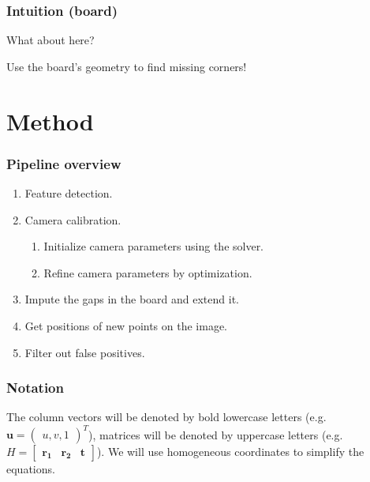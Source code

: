 \documentclass{beamer}
\begin{document}
\begin{frame}
	\frametitle{Intuition (board)}
	What about here?

	\begin{figure}
	\end{figure}
\end{frame}

\begin{frame}[standout]
	Use the board's geometry to find missing corners!
\end{frame}

\section*{Method}\label{sec:method}

\begin{frame}
	\frametitle{Pipeline overview}

	\begin{enumerate}
		\item Feature detection.
		\item Camera calibration.
		      \begin{enumerate}
			      \item Initialize camera parameters using the solver.
			      \item Refine camera parameters by optimization.
		      \end{enumerate}
		\item Impute the gaps in the board and extend it.
		\item Get positions of new points on the image.
		\item Filter out false positives.
	\end{enumerate}
\end{frame}

\begin{frame}
	\frametitle{Notation}
	The column vectors will be denoted by bold lowercase letters (e.g.
	\(\mathbf{u} = \begin{pmatrix}
		u, v, 1
	\end{pmatrix}^{T}\)), matrices will be denoted by uppercase letters (e.g.
	\(H = \begin{bmatrix}
		\mathbf{r_1} & \mathbf{r_2} & \mathbf{t}
	\end{bmatrix}
	\)). We will use homogeneous coordinates to simplify the equations.
\end{frame}
\end{document}

